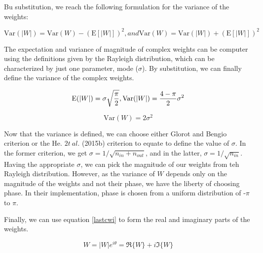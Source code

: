  Bu substitution, we reach the following formulation for the variance of the weights:
 
 \begin{equation}\label{varw2}
 \mathrm{Var}(|W|) = \mathrm{Var}(W)-(\mathrm{E}[|W|])^2 , and  
 \mathrm{Var}(W) = \mathrm{Var}(|W|) + (\mathrm{E}[|W|])^2
 \end{equation}
  
 The expectation and variance of magnitude of complex weights can be computer using the definitions given by the Rayleigh distribution, which can be characterized by just one parameter, mode ($\sigma$). By substitution, we can finally define the variance of the complex weights.
 
 \begin{equation}\label{ray1}
 \mathrm{E}(|W|) = \sigma\sqrt{\frac{\pi}{2}},\\  
 \mathrm{Var}(|W|) = \frac{4-\pi}{2}\sigma^{2}
 \end{equation}
 
 
 \begin{equation}\label{ray2}
 \mathrm{Var}(W) = 2\sigma^2
 \end{equation}
 
 Now that the variance is defined,  we can choose either Glorot and Bengio criterion or the He. $2t \ al.$ (2015b) criterion to equate to define the value of $\sigma$. In the former criterion, we get $\sigma = 1/\sqrt{n_{in}+n_{out}}$, and in the latter, $\sigma = 1/\sqrt{n_{in}}$. Having the appropriate $\sigma$, we can pick the magnitude of our weights from teh Rayleigh distribution. However, as the variance of $W$ depends only on the magnitude of the weights and not their phase,  we have the liberty of choosing phase. In their implementation, phase is chosen from a uniform distribution of -$\pi$ to $\pi$.
 
 Finally, we can use equation \ref{lastcwi} to form the real and imaginary parts of the weights.
 
 \begin{equation}\label{lastcwi}
 W = |W|e^{i\theta} = \Re\{W\}+i\Im\{W\}
 \end{equation}
 
 
 
 
 
